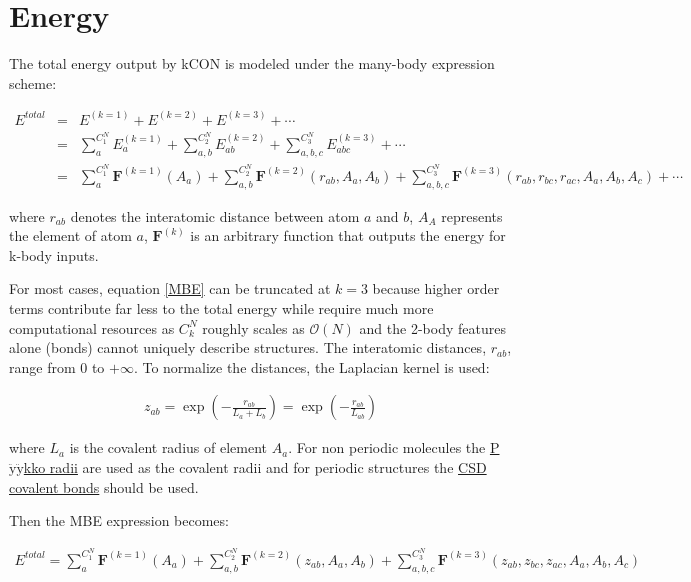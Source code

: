 \section{Energy}

The total energy output by kCON is modeled under the many-body expression scheme:

\begin{eqnarray}\label{MBE}
E^{total}
& = &
E^{(k=1)} + E^{(k=2)} + E^{(k=3)} + \cdots \nonumber \\
& = & 
\sum_{a}^{C^N_1}{E^{(k=1)}_{a}} + 
\sum_{a,b}^{C^{N}_2}{E^{(k=2)}_{ab}} + 
\sum_{a,b,c}^{C^{N}_3}{E^{(k=3)}_{abc}} + \cdots \nonumber \\
& = & 
\sum_{a}^{C^N_1}{\mathbf{F}^{(k=1)}(A_a)} + 
\sum_{a,b}^{C^{N}_2}{\mathbf{F}^{(k=2)}(r_{ab}, A_a, A_b)} + 
\sum_{a,b,c}^{C^{N}_3}{\mathbf{F}^{(k=3)}(r_{ab}, r_{bc}, r_{ac}, A_a, A_b, A_c)} + \cdots
\end{eqnarray}

\noindent where $r_{ab}$ denotes the interatomic distance between atom $a$ and $b$, $A_A$ 
represents the element of atom $a$, $\mathbf{F}^{(k)}$ is an arbitrary function that outputs
the energy for k-body inputs.

For most cases, equation \ref{MBE} can be truncated at $k = 3$ because 
higher order terms contribute far less to the total energy while require much more 
computational resources as $C^N_k$ roughly scales as $\mathcal{O}(N)$ and the 2-body 
features alone (bonds) cannot uniquely describe structures. The interatomic distances, 
${r_{ab}}$, range from 0 to $+\infty$. To normalize the distances, the Laplacian kernel is 
used:

\begin{eqnarray}\label{eqn:laplacian}
z_{ab} 
= \exp{\left(-\frac{r_{ab}}{L_{a} + L_{b}}\right)}
= \exp{\left(-\frac{r_{ab}}{L_{ab}}\right)}
\end{eqnarray}

\noindent where $L_{a}$ is the covalent radius of element $A_{a}$. For non periodic 
molecules the \href{http://pubs.acs.org/doi/pdf/10.1021/jp5065819}
{P$\ddot{\mathrm{y}}\ddot{\mathrm{y}}$kko radii} are used as the covalent radii and 
for periodic structures the 
\href{http://pubs.rsc.org/en/content/articlepdf/2008/DT/B801115J}{CSD covalent bonds} should be 
used. 

Then the MBE expression becomes:

\begin{eqnarray}
E^{total} =
\sum_{a}^{C^N_1}{\mathbf{F}^{(k=1)}(A_a)} + 
\sum_{a,b}^{C^{N}_2}{\mathbf{F}^{(k=2)}(z_{ab}, A_a, A_b)} + 
\sum_{a,b,c}^{C^{N}_3}{\mathbf{F}^{(k=3)}(z_{ab}, z_{bc}, z_{ac}, A_a, A_b, A_c)}
\end{eqnarray}

